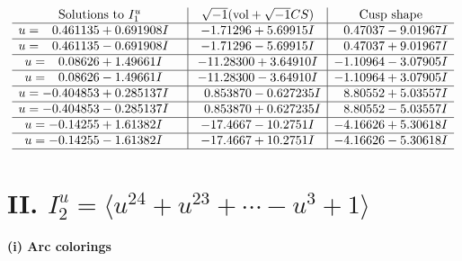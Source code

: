 \documentclass[1p]{elsarticle_modified}
\theoremstyle{definition}
\newcommand{\I}{\sqrt{-1}}
\begin{document}
$$\begin{array}{c|c|c}  
\text{Solutions to }I^u_{1}& \I (\text{vol} + \sqrt{-1}CS) & \text{Cusp shape}\\
 \hline 
\begin{aligned}
u &= \phantom{-}0.461135 + 0.691908 I\end{aligned}
 & -1.71296 + 5.69915 I & \phantom{-}0.47037 - 9.01967 I \\ \hline\begin{aligned}
u &= \phantom{-}0.461135 - 0.691908 I\end{aligned}
 & -1.71296 - 5.69915 I & \phantom{-}0.47037 + 9.01967 I \\ \hline\begin{aligned}
u &= \phantom{-}0.08626 + 1.49661 I\end{aligned}
 & -11.28300 + 3.64910 I & -1.10964 - 3.07905 I \\ \hline\begin{aligned}
u &= \phantom{-}0.08626 - 1.49661 I\end{aligned}
 & -11.28300 - 3.64910 I & -1.10964 + 3.07905 I \\ \hline\begin{aligned}
u &= -0.404853 + 0.285137 I\end{aligned}
 & \phantom{-}0.853870 - 0.627235 I & \phantom{-}8.80552 + 5.03557 I \\ \hline\begin{aligned}
u &= -0.404853 - 0.285137 I\end{aligned}
 & \phantom{-}0.853870 + 0.627235 I & \phantom{-}8.80552 - 5.03557 I \\ \hline\begin{aligned}
u &= -0.14255 + 1.61382 I\end{aligned}
 & -17.4667 - 10.2751 I & -4.16626 + 5.30618 I \\ \hline\begin{aligned}
u &= -0.14255 - 1.61382 I\end{aligned}
 & -17.4667 + 10.2751 I & -4.16626 - 5.30618 I\\
 \hline 
 \end{array}$$\newpage\newpage\renewcommand{\arraystretch}{1}
\centering \section*{II. $I^u_{2}= \langle u^{24}+u^{23}+\cdots- u^3+1 \rangle$}
\flushleft \textbf{(i) Arc colorings}\\
\end{document}
